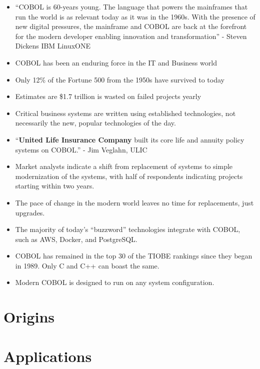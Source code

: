 \documentclass[12pt]{article}
\begin{document}
\begin{itemize}

    \item ``COBOL is 60-years young. The language that powers the mainframes that run the world is as relevant today as it was in the 1960s. With the presence of new digital pressures, the mainframe and COBOL are back at the forefront for the modern developer enabling innovation and transformation'' - Steven Dickens IBM LinuxONE
    \item COBOL has been an enduring force in the IT and Business world
    \item Only 12\% of the Fortune 500 from the 1950s have survived to today
    \item Estimates are \$1.7 trillion is wasted on failed projects yearly
    \item Critical business systems are written using established technologies, not necessarily the new, popular technologies of the day.
    \item ``\textbf{United Life Insurance Company} built its core life and annuity policy systems on COBOL.'' - Jim Veglahn, ULIC
    \item Market analysts indicate a shift from replacement of systems to simple modernization of the systems, with half of respondents indicating projects starting within two years.
    \item The pace of change in the modern world leaves no time for replacements, just upgrades.
    \item The majority of today's ``buzzword'' technologies integrate with COBOL, such as AWS, Docker, and PostgreSQL.
    \item COBOL has remained in the top 30 of the TIOBE rankings since they began in 1989. Only C and C++ can boast the same.
    \item Modern COBOL is designed to run on any system configuration.

\end{itemize}



\section{Origins}

\begin{itemize}

\end{itemize}



\section{Applications}
\end{document}

